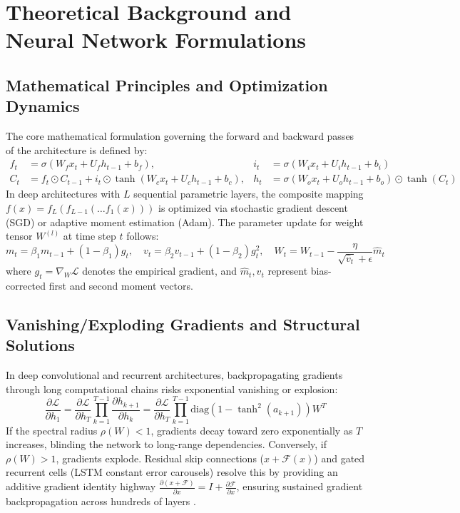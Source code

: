 \section{Theoretical Background and Neural Network Formulations}

\subsection{Mathematical Principles and Optimization Dynamics}
The core mathematical formulation governing the forward and backward passes of the architecture is defined by:
\begin{align}
  f_t &= \sigma(W_f x_t + U_f h_{t-1} + b_f), & i_t &= \sigma(W_i x_t + U_i h_{t-1} + b_i) \nonumber \\
  C_t &= f_t \odot C_{t-1} + i_t \odot \tanh(W_c x_t + U_c h_{t-1} + b_c), & h_t &= \sigma(W_o x_t + U_o h_{t-1} + b_o) \odot \tanh(C_t)
\label{eq:core_math}
\end{align}
In deep architectures with $L$ sequential parametric layers, the composite mapping $f(x) = f_L(f_{L-1}(\dots f_1(x)))$ is optimized via stochastic gradient descent (SGD) or adaptive moment estimation (Adam). The parameter update for weight tensor $W^{(l)}$ at time step $t$ follows:
\begin{equation}
  m_t = \beta_1 m_{t-1} + (1 - \beta_1) g_t, \quad v_t = \beta_2 v_{t-1} + (1 - \beta_2) g_t^2, \quad W_t = W_{t-1} - \frac{\eta}{\sqrt{\hat{v}_t} + \epsilon} \hat{m}_t
\end{equation}
where $g_t = \nabla_W \mathcal{L}$ denotes the empirical gradient, and $\hat{m}_t, \hat{v}_t$ represent bias-corrected first and second moment vectors.

\subsection{Vanishing/Exploding Gradients and Structural Solutions}
In deep convolutional and recurrent architectures, backpropagating gradients through long computational chains risks exponential vanishing or explosion:
\begin{equation}
  \frac{\partial \mathcal{L}}{\partial h_1} = \frac{\partial \mathcal{L}}{\partial h_T} \prod_{k=1}^{T-1} \frac{\partial h_{k+1}}{\partial h_k} = \frac{\partial \mathcal{L}}{\partial h_T} \prod_{k=1}^{T-1} \text{diag}(1 - \tanh^2(a_{k+1})) W^T
\end{equation}
If the spectral radius $\rho(W) < 1$, gradients decay toward zero exponentially as $T$ increases, blinding the network to long-range dependencies. Conversely, if $\rho(W) > 1$, gradients explode. Residual skip connections ($x + \mathcal{F}(x)$) and gated recurrent cells (LSTM constant error carousels) resolve this by providing an additive gradient identity highway $\frac{\partial (x + \mathcal{F})}{\partial x} = I + \frac{\partial \mathcal{F}}{\partial x}$, ensuring sustained gradient backpropagation across hundreds of layers \cite{he2016deep, hochreiter1997long}.

